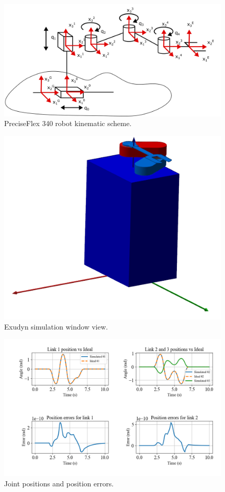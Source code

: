 \documentclass[conference]{IEEEtran}
\begin{document}
\begin{figure}[htbp]
    \centering
    \includegraphics[width=\linewidth]{fancy scara.png}
    \caption{PreciseFlex 340 robot kinematic scheme.}
    \label{fig:modified_scara}
\end{figure}

\begin{figure}[htbp]
    \centering
    \includegraphics[width=\linewidth]{sim window.png}
    \caption{Exudyn simulation window view.}
    \label{fig:modified_scara}
\end{figure}

\begin{figure}[htbp]
    \centering
    \includegraphics[width=\linewidth]{positions plot.png}
    \caption{Joint positions and position errors.}
    \label{fig:modified_scara}
\end{figure}
\end{document}
